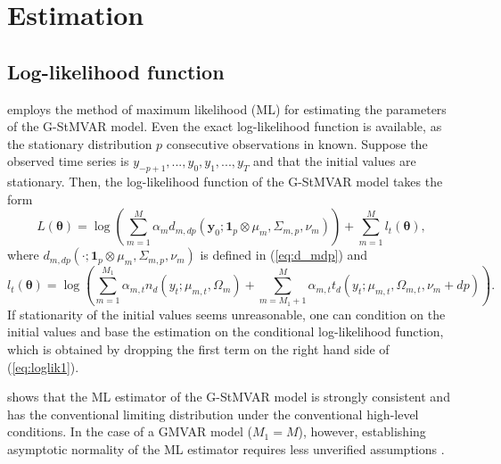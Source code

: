 \documentclass[nojss]{jss}
\begin{document}
\section{Estimation}\label{sec:estimation}

\subsection{Log-likelihood function}\label{sec:loglik}

 employs the method of maximum likelihood (ML) for estimating the parameters of the G-StMVAR model. Even the exact log-likelihood function is available, as the stationary distribution $p$ consecutive observations in known. Suppose the observed time series is $y_{-p+1},...,y_0,y_1,...,y_T$ and that the initial values are stationary.  Then, the log-likelihood function of the G-StMVAR model takes the form
\begin{equation}\label{eq:loglik1}
L(\boldsymbol{\theta})=\log\left(\sum_{m=1}^M\alpha_m d_{m,dp}(\boldsymbol{y}_0;\boldsymbol{1}_p\otimes\mu_m,\Sigma_{m,p},\nu_m) \right) + \sum_{m=1}^M l_t(\boldsymbol{\theta}),
\end{equation}
where $d_{m,dp}(\cdot;\boldsymbol{1}_p\otimes\mu_m,\Sigma_{m,p},\nu_m)$ is defined in (\ref{eq:d_mdp}) and
\begin{equation}\label{eq:loglik2}
l_t(\boldsymbol{\theta}) = \log\left(\sum_{m=1}^{M_1}  \alpha_{m,t}n_d(y_t;\mu_{m,t},\Omega_{m})  + \sum_{m=M_1 + 1}^M  \alpha_{m,t}t_d(y_t;\mu_{m,t},\Omega_{m,t},\nu_m + dp  ) \right).
\end{equation}
If stationarity of the initial values seems unreasonable,  one can condition on the initial values and base the estimation on the conditional log-likelihood function, which is obtained by dropping the first term on the right hand side of (\ref{eq:loglik1}).

\citet[Theorem 3]{Virolainen2:2021} shows that the ML estimator of the G-StMVAR model is strongly consistent and has the conventional limiting distribution under the conventional high-level conditions. In the case of a GMVAR model ($M_1=M$), however, establishing asymptotic normality of the ML estimator requires less unverified assumptions \cite[Theorem 3]{Kalliovirta+Meitz+Saikkonen:2016}.
\end{document}
